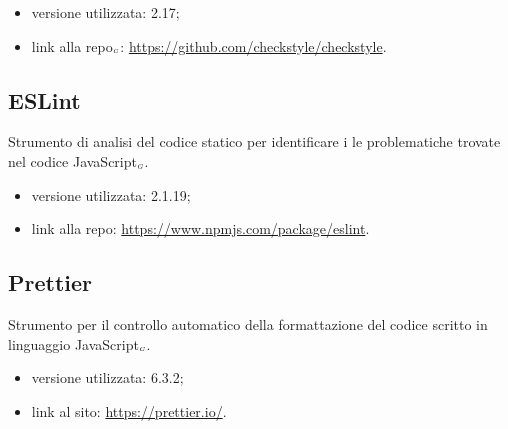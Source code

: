 \begin{itemize}
  \item versione utilizzata: 2.17;
  \item link alla repo$_{\scaleto{G}{3pt}}$: \url{https://github.com/checkstyle/checkstyle}.
\end{itemize}

\subsection{ESLint}\label{LibrerieESLint}
Strumento di analisi del codice statico per identificare i le problematiche trovate nel codice JavaScript$_{\scaleto{G}{3pt}}$.

\begin{itemize}
  \item versione utilizzata: 2.1.19;
  \item link alla repo: \url{https://www.npmjs.com/package/eslint}.
\end{itemize}

\subsection{Prettier}\label{LibreriePrettier}
Strumento per il controllo automatico della formattazione del codice scritto in linguaggio JavaScript$_{\scaleto{G}{3pt}}$.

\begin{itemize}
  \item versione utilizzata: 6.3.2;
  \item link al sito: \url{https://prettier.io/}.
\end{itemize}
